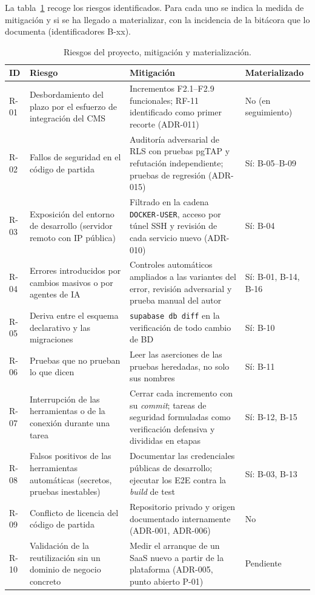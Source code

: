 La tabla~\ref{tab:riesgos} recoge los riesgos identificados. Para cada uno se
indica la medida de mitigación y si se ha llegado a materializar, con la
incidencia de la bitácora que lo documenta (identificadores B-xx).

\begin{table}[htbp]
  \centering
  \footnotesize
  \caption{Riesgos del proyecto, mitigación y materialización.}
  \label{tab:riesgos}
  \begin{tabularx}{\textwidth}{@{}l>{\raggedright\arraybackslash}p{3.6cm}>{\raggedright\arraybackslash}Xl@{}}
    \toprule
    \textbf{ID} & \textbf{Riesgo} & \textbf{Mitigación} & \textbf{Materializado} \\
    \midrule
    R-01 & Desbordamiento del plazo por el esfuerzo de integración del CMS &
      Incrementos F2.1--F2.9 funcionales; RF-11 identificado como primer recorte (ADR-011) & No (en seguimiento) \\
    R-02 & Fallos de seguridad en el código de partida &
      Auditoría adversarial de RLS con pruebas pgTAP y refutación independiente; pruebas de regresión (ADR-015) & Sí: B-05--B-09 \\
    R-03 & Exposición del entorno de desarrollo (servidor remoto con IP pública) &
      Filtrado en la cadena \texttt{DOCKER-USER}, acceso por túnel SSH y revisión de cada servicio nuevo (ADR-010) & Sí: B-04 \\
    R-04 & Errores introducidos por cambios masivos o por agentes de IA &
      Controles automáticos ampliados a las variantes del error, revisión adversarial y prueba manual del autor & Sí: B-01, B-14, B-16 \\
    R-05 & Deriva entre el esquema declarativo y las migraciones &
      \texttt{supabase db diff} en la verificación de todo cambio de BD & Sí: B-10 \\
    R-06 & Pruebas que no prueban lo que dicen &
      Leer las aserciones de las pruebas heredadas, no solo sus nombres & Sí: B-11 \\
    R-07 & Interrupción de las herramientas o de la conexión durante una tarea &
      Cerrar cada incremento con su \textit{commit}; tareas de seguridad formuladas como verificación defensiva y divididas en etapas & Sí: B-12, B-15 \\
    R-08 & Falsos positivos de las herramientas automáticas (secretos, pruebas inestables) &
      Documentar las credenciales públicas de desarrollo; ejecutar los E2E contra la \textit{build} de test & Sí: B-03, B-13 \\
    R-09 & Conflicto de licencia del código de partida &
      Repositorio privado y origen documentado internamente (ADR-001, ADR-006) & No \\
    R-10 & Validación de la reutilización sin un dominio de negocio concreto &
      Medir el arranque de un SaaS nuevo a partir de la plataforma (ADR-005, punto abierto P-01) & Pendiente \\
    \bottomrule
  \end{tabularx}
\end{table}


